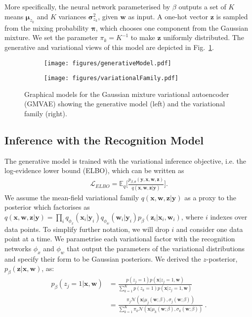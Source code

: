 \documentclass{article} \usepackage{iclr2017_conference,times}
\begin{document}
More specifically, the neural network parameterised by $\beta$ outputs a set of $K$ means $\pmb{\mu}_{z_k}$ and $K$ variances $\pmb{\sigma}^2_{z_k}$, given $\pmb{w}$ as input. A one-hot vector $\pmb{z}$ is sampled from the mixing probability $\pmb{\pi}$, which chooses one component from the Gaussian mixture. We set the parameter $\pi_k = K^{-1}$ to make $\pmb{z}$ uniformly distributed. The generative and variational views of this model are depicted in Fig.~\ref{fig:graphModel}.

\begin{figure}[h]
\centering
\begin{subfigure}{0.5\textwidth}
	\centering
	\texttt{[image: figures/generativeModel.pdf]}
\end{subfigure}\begin{subfigure}{0.5\textwidth}
	\centering
	\texttt{[image: figures/variationalFamily.pdf]}
\end{subfigure}\caption{Graphical models for the Gaussian mixture variational autoencoder (GMVAE) showing the generative model (left) and the variational family (right).}
\label{fig:graphModel}
\end{figure}

\subsection{Inference with the Recognition Model}

The generative model is trained with the variational inference objective, i.e. the log-evidence lower bound (ELBO), which can be written as
\begin{align}
 \mathcal{L}_{ELBO} = \mathbb{E}_q\bigg[ \frac{ p_{\beta, \theta}(\pmb{y},\pmb{x},\pmb{w},\pmb{z}) }{q(\pmb{x},\pmb{w},\pmb{z} | \pmb{y} )}  \bigg].
\end{align}
We assume the mean-field variational family $q(\pmb{x},\pmb{w},\pmb{z}| \pmb{y})$ as a proxy to the posterior which factorises as $q(\pmb{x},\pmb{w},\pmb{z}| \pmb{y}) = \prod_i q_{\phi_{x}}(\pmb{x}_i| \pmb{y}_i)q_{\phi_w}(\pmb{w}_i| \pmb{y}_i)p_{\beta}(\pmb{z}_i| \pmb{x}_i, \pmb{w}_i)$, where $i$ indexes over data points. To simplify further notation, we will drop $i$ and consider one data point at a time. We parametrise each variational factor with the recognition networks $\phi_{x}$ and $\phi_{w}$ that output the parameters of the variational distributions and specify their form to be Gaussian posteriors. We derived the $z$-posterior, $p_{\beta}(\pmb{z}| \pmb{x}, \pmb{w})$, as:
\begin{align}
 p_{\beta}(z_j= 1|\pmb{x}, \pmb{w}) &= \frac{p(z_j = 1)p(\pmb{x}|z_j = 1, \pmb{w})}{\sum_{k=1}^K p(z_k =1)p(\pmb{x}|z_j = 1, \pmb{w})} \nonumber \\
                   &=  \frac{\pi_j \mathcal{N}(\pmb{x}|\mu_j(\pmb{w};\beta), \sigma_j(\pmb{w};\beta))}{\sum_{k=1}^K \pi_k \mathcal{N}(\pmb{x}|\mu_k(\pmb{w};\beta), \sigma_k(\pmb{w};\beta))} ~ .
\label{eq:zposterior}
\end{align}
\end{document}
